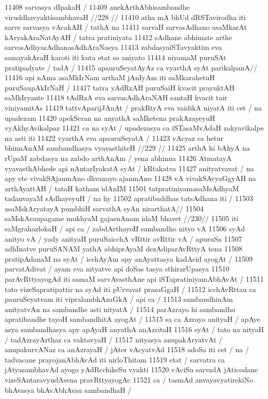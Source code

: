 11408 sarvasya dIpakaH / 
11409 	anekArthAbhisambandhe viruddhavyaktisambhavaH //228 // 
11410 atha mA bhUd dRSTavirodha iti sarve sarvasya vAcakAH / tathA na  
11411 sarvaH sarvasAdhano asaMkarAt kAryakAraNatAyAH / tatra pratiniyata
11412 sAdhane abhimate arthe sarvasAdhyasAdhanasAdhAraNasya 
11413 zabdasyaiSTavyaktim eva samayakAraH karoti iti kuta etat so aniyato 
11414 niyamaM puruSAt pratipadyate / tadA /  
11415 	apauruSeyatAyAz ca vyarthA syAt parikalpanA// 
11416 api nAma asaMkIrNam arthaM jAnIyAm iti saMkarahetuH puruSaupAkIrNaH /
11417 tatra yAdRzAH puruSaiH kvacit prayuktAH saMkIryante 
11418 tAdRzA eva sarvasAdhAraNAH santaH kvacit tair viniyamitAs 
11419 tattvAparijJAnAt / prakRtyA eva vaidikA niyatA iti cet / na upadezam
11420 apekSeran na anyathA saMketena prakAzayeyuH vyAkhyAvikalpaz 
11421 ca na syAt / upadezasya ca iSTasaMvAdaH zakyavikalpe na asti iti
11422 vyarthA eva apauruSeyatA / 
11423 	vAcyaz ca hetur bhinnAnAM sambandhasya vyavasthiteH //229 // 
11425 arthA hi bAhyA na rUpaM zabdasya na zabdo arthAnAm / yena abhinna  
11426 AtmatayA vyavasthAbhede api nAntarIyakatA syAt / kRtakatva 
11427 anityatvavat / na apy ete vivakSAjanmAno dhvanayo ajanmAno  
11428 vA vivakSAvyaGgyAH na arthAyattAH / tataH katham idAnIM
11501 tatpratiniyamasaMsAdhyaM tadanvayaM sAdhayeyuH / na hy
11502 apratibaddhas tatsAdhana iti /
11503 	asaMskAryatayA pumbhiH sarvathA syAn nirarthatA//
11504 	saMskAraupagame mukhyaM gajasnAnam idaM bhavet //230//
11505 iti saMgrahazlokaH / api ca / zabdArthayoH sambandho nityo vA 
11506 syAd anityo vA / yady anityaH puruSaicchA vRttir avRttir vA / apuruSa
11507 adhInatve puruSANAM yathA abhiprAyaM dezAdiparAvRttyA tena  
11508 pratipAdanaM na syAt / icchAyAm apy anAyattasya kadAcid ayogAt /
11509 parvatAdivat / ayam eva nityatve api doSas tasya sthirarUpasya
11510 parAvRttyayogAd iti samaM sarvAvasthAne api iSTapratiniyamAbhAvAt /
11511 tato vizeSapratipattir na syAd iti pUrvavat prasaGgaH / 
11512 icchAvRttau ca pauruSeyatvam iti vipralambhAzaGkA / api ca /  
11513 	sambandhinAm anityatvAn na sambandhe asti nityatA /
11514 parAzrayo hi sambandho apratibandhe tayoH sambandhitA ayogAt /
11515 sa ca Azrayo anityaH / apAye asya sambandhasya apy apAyaH anyathA anAzritaH
11516 syAt / tato na nityaH / tadAzrayArthaz ca vaktavyaH / 
11517 nityasya anupakAryatvAt / anupakurvANaz ca anAzrayaH / jAter vAcyatvAd
11518 adoSa iti cet / na / tadvacane prayojanAbhAvAd iti nirloThitam 
11519 etat / sarvatra ca jAtyasambhavAd ayogo yAdRcchikeSu vyakti
11520 vAciSu sarvadA jAticodane vizeSAntaravyudAsena pravRttyayogAc
11521 ca / tasmAd anvayavyatirekiNo bhAvasya bhAvAbhAvau sambandhaH / 
